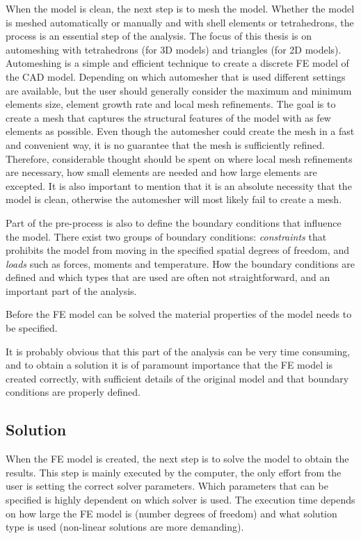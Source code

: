When the model is clean, the next step is to mesh the model. Whether the model is meshed automatically or manually and with shell elements or tetrahedrons, the process is an essential step of the analysis. The focus of this thesis is on automeshing with tetrahedrons (for 3D models) and triangles (for 2D models). Automeshing is a simple and efficient technique to create a discrete FE model of the CAD model. Depending on which automesher that is used different settings are available, but the user should generally consider the maximum and minimum elements size, element growth rate and local mesh refinements. The goal is to create a mesh that captures the structural features of the model with as few elements as possible. Even though the automesher could create the mesh in a fast and convenient way, it is no guarantee that the mesh is sufficiently refined. Therefore, considerable thought should be spent on where local mesh refinements are necessary, how small elements are needed and how large elements are excepted. It is also important to mention that it is an absolute necessity that the model is clean, otherwise the automesher will most likely fail to create a mesh.~\cite[p.~251-255]{adams99}

Part of the pre-process is also to define the boundary conditions that influence the model. There exist two groups of boundary conditions: \textit{constraints} that prohibits the model from moving in the specified spatial degrees of freedom, and \textit{loads} such as forces, moments and temperature. How the boundary conditions are defined and which types that are used are often not straightforward, and an important part of the analysis.~\cite[p.~263]{adams99}

Before the FE model can be solved the material properties of the model needs to be specified.

It is probably obvious that this part of the analysis can be very time consuming, and to obtain a solution it is of paramount importance that the FE model is created correctly, with sufficient details of the original model and that boundary conditions are properly defined.

\subsection{Solution} %
\label{sub:solution}
When the FE model is created, the next step is to solve the model to obtain the results. This step is mainly executed by the computer, the only effort from the user is setting the correct solver parameters. Which parameters that can be specified is highly dependent on which solver is used. The execution time depends on how large the FE model is (number degrees of freedom) and what solution type is used (non-linear solutions are more demanding).

